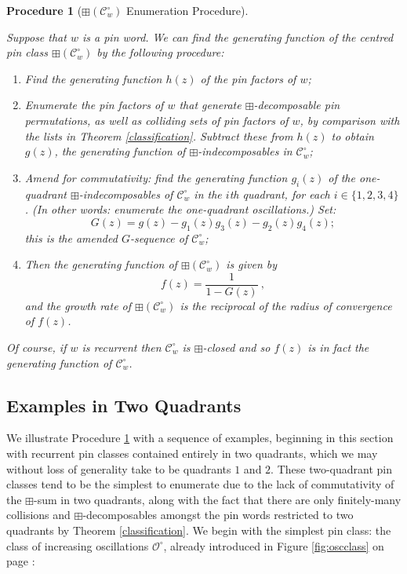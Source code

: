 \documentclass[11pt,a4paper]{article}
\newtheorem{procedure}[thm]{Procedure}
\theoremstyle{definition}
\begin{document}
\begin{procedure}[$\boxplus\left(\mathcal{C}^{\circ}_{w}\right)$ Enumeration Procedure]\label{recproc}

Suppose that $w$ is a pin word. We can find the generating function of the centred pin class $\boxplus\left(\mathcal{C}^{\circ}_{w}\right)$ by the following procedure:

\begin{enumerate}
\item Find the generating function $h(z)$ of the pin factors of $w$;
\item Enumerate the pin factors of $w$ that generate $\boxplus$-decomposable pin permutations, as well as colliding sets of pin factors of $w$, by comparison with the lists in Theorem \ref{classification}. Subtract these from $h(z)$ to obtain $g(z)$, the generating function of $\boxplus$-indecomposables in $\mathcal{C}^{\circ}_{w}$;
\item Amend for commutativity: find the generating function $g_{i}(z)$ of the one-quadrant $\boxplus$-indecomposables of $\mathcal{C}^{\circ}_{w}$ in the $i$th quadrant, for each $i \in \{1,2,3,4\}$. (In other words: enumerate the one-quadrant oscillations.) Set:
\[
G(z) = g(z) - g_{1}(z)g_{3}(z) - g_{2}(z)g_{4}(z);
\]
this is the amended $G$-sequence of $\mathcal{C}^{\circ}_{w}$;
\item Then the generating function of $\boxplus\left(\mathcal{C}^{\circ}_{w}\right)$ is given by
\[
f(z) = \frac{1}{1 - G(z)} \ ,
\]
and the growth rate of $\boxplus\left(\mathcal{C}^{\circ}_{w}\right)$ is the reciprocal of the radius of convergence of $f(z)$.
\end{enumerate}

Of course, if $w$ is recurrent then $\mathcal{C}^{\circ}_{w}$ is $\boxplus$-closed and so $f(z)$ is in fact the generating function of $\mathcal{C}^{\circ}_{w}$.

\end{procedure}

\subsection{Examples in Two Quadrants} \label{sec:3.7}

We illustrate Procedure \ref{recproc} with a sequence of examples, beginning in this section with recurrent pin classes contained entirely in two quadrants, which we may without loss of generality take to be quadrants $1$ and $2$. These two-quadrant pin classes tend to be the simplest to enumerate due to the lack of commutativity of the $\boxplus$-sum in two quadrants, along with the fact that there are only finitely-many collisions and $\boxplus$-decomposables amongst the pin words restricted to two quadrants by Theorem \ref{classification}. We begin with the simplest pin class: the class of increasing oscillations $\mathcal{O}^{\circ}$, already introduced in Figure \ref{fig:oscclass} on page \pageref{fig:oscclass}:
\end{document}
